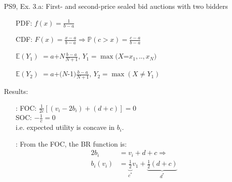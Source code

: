 \begin{frame}{PS9, Ex. 3.a: First- and second-price sealed bid auctions with two bidders}
\begin{multicols}{2}
\begin{enumerate}
        \item[PDF:] $f(x)=\frac{1}{b-a}$
        \item[CDF:] $F(x)=\frac{x-a}{b-a}\Rightarrow\mathbb{P}(c>x)=\frac{c-a}{b-a}$
        \item[$\mathbb{E}(Y_1)$] $=a$+$N\frac{b-a}{N+1}$, $Y_1=\max(X$=$x_1,..,x_N)$
        \item[$\mathbb{E}(Y_2)$] $=a$+$(N$-1$)\frac{b-a}{N+1}$, $Y_2=\max(X\neq Y_1)$
      \end{enumerate}
      \vspace{-6pt}
      Results:
      \vspace{-6pt}
      \begin{itemize}
        \item[\nth{2}:] FOC: $\frac{1}{2c}[(v_i-2b_i)+(d+c)]=0$\\
                        SOC: $-\frac{1}{c}=0$\\
                        i.e. expected utility is concave in $b_i$.
        \item[\nth{3}:] From the FOC, the BR function is:\vspace{-6pt}
                        \begin{align*}
                          2b_i&=v_i+d+c\Rightarrow\\
                          b_i(v_i)&=\underbrace{\frac{1}{2}}_{c^*}v_1+\underbrace{\frac{1}{2}(d+c)}_{d^*}
                        \end{align*}
      \end{itemize}
      \vfill\null
    \end{multicols}
\end{frame}
